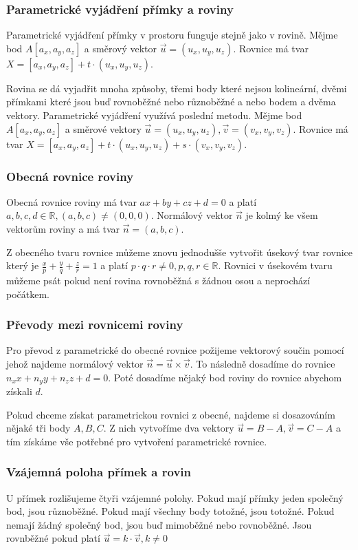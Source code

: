 \documentclass[12pt]{article}
\begin{document}
\subsubsection*{Parametrické vyjádření přímky a roviny}
Parametrické vyjádření přímky v prostoru funguje stejně jako v rovině. Mějme bod $A[a_x, a_y, a_z]$ a
směrový vektor $\vec{u} = (u_x, u_y, u_z)$. Rovnice má tvar $X = [a_x, a_y, a_z] + t \cdot
(u_x, u_y, u_z)$.

Rovina se dá vyjadřit mnoha způsoby, třemi body které nejsou kolineární, dvěmi přímkami které jsou
buď rovnoběžné nebo různoběžné a nebo bodem a dvěma vektory. Parametrické vyjádření využívá poslední
metodu. Mějme bod $A[a_x, a_y, a_z]$ a směrové vektory $\vec{u} = (u_x, u_y, u_z), \vec{v} = (v_x,
v_y, v_z)$. Rovnice má tvar $X = [a_x, a_y, a_z] + t \cdot (u_x, u_y, u_z) + s \cdot (v_x, v_y, v_z)$.

\subsubsection*{Obecná rovnice roviny}
Obecná rovnice roviny má tvar $ax + by + cz + d = 0$ a platí $a, b, c, d \in \mathbb{R}, (a, b, c)
\ne (0, 0, 0)$. Normálový
vektor $\vec{n}$ je kolmý ke všem vektorům roviny a má tvar $\vec{n} = (a, b, c)$.

Z obecného tvaru rovnice můžeme znovu jednodušše vytvořit úsekový tvar rovnice který je
$\frac{x}{p} + \frac{y}{q} + \frac{z}{r} = 1$ a platí $p \cdot q \cdot r \ne 0, p, q, r \in 
\mathbb{R}$. Rovnici v úsekovém tvaru můžeme psát pokud není rovina rovnoběžná s žádnou osou a
neprochází počátkem.

\subsubsection*{Převody mezi rovnicemi roviny}
Pro převod z parametrické do obecné rovnice požijeme vektorový součin pomocí jehož najdeme normálový
vektor $\vec{n} = \vec{u} \times \vec{v}$. To následně dosadíme do rovnice $n_xx + n_yy + n_zz + d
= 0$. Poté dosadíme nějaký bod roviny do rovnice abychom získali $d$.

Pokud chceme získat parametrickou rovnici z obecné, najdeme si dosazováním nějaké tři body $A, B, C$.
Z nich vytvoříme dva vektory $\vec{u} = B - A, \vec{v} = C - A$ a tím získáme vše potřebné pro
vytvoření parametrické rovnice.

\subsubsection*{Vzájemná poloha přímek a rovin}
U přímek rozlišujeme čtyři vzájemné polohy. Pokud mají přímky jeden společný bod, jsou různoběžné.
Pokud mají všechny body totožné, jsou totožné. Pokud nemají žádný společný bod, jsou buď mimoběžné
nebo rovnoběžné. Jsou rovnběžné pokud platí $\vec{u} = k \cdot \vec{v}, k \ne 0$
\end{document}
